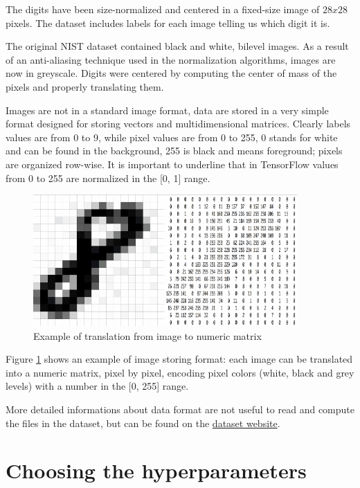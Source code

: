 The digits have been size-normalized and centered in a fixed-size image of $28x28$ pixels. The dataset includes labels for each image telling us which digit it is.

The original NIST dataset contained black and white, bilevel images. As a result of an anti-aliasing technique used in the normalization algorithms, images are now in greyscale. Digits were centered by computing the center of mass of the pixels and properly translating them.

Images are not in a standard image format, data are stored in a very simple format designed for storing vectors and multidimensional matrices. Clearly labels values are from 0 to 9, while pixel values are from 0 to 255, 0 stands for white and can be found in the background, 255 is black and means foreground; pixels are organized row-wise. It is important to underline that in TensorFlow values from 0 to 255 are normalized in the [0, 1] range.

\begin{figure}
	\centering
	\includegraphics[width=0.9\textwidth]{Images/image_to_matrix}
	\caption{Example of translation from image to numeric matrix}
	\label{fig:image_to_matrix}
\end{figure}

Figure \ref{fig:image_to_matrix} shows an example of image storing format: each image can be translated into a numeric matrix, pixel by pixel, encoding pixel colors (white, black and grey levels) with a number in the [0, 255] range.

More detailed informations about data format are not useful to read and compute the files in the dataset, but can be found on the \href{http://yann.lecun.com/exdb/mnist/}{dataset website}.

\section{Choosing the hyperparameters}

